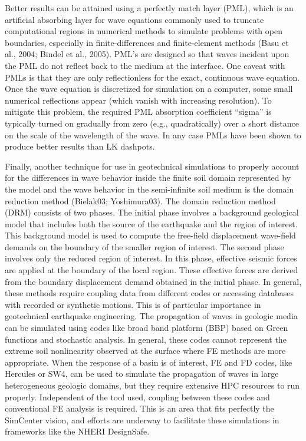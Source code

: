 Better results can be attained using a perfectly match layer (PML), which is an artificial absorbing layer for wave equations commonly used to truncate computational regions in numerical methods to simulate problems with open boundaries, especially in finite-differences and finite-element methods (Basu et al., 2004; Bindel et al., 2005). PML’s are designed so that waves incident upon the PML do not reflect back to the medium at the interface. One caveat with PMLs is that they are only reflectionless for the exact, continuous wave equation. Once the wave equation is discretized for simulation on a computer, some small numerical reflections appear (which vanish with increasing resolution). To mitigate this problem, the required PML absorption coefficient “sigma” is typically turned on gradually from zero (e.g., quadratically) over a short distance on the scale of the wavelength of the wave. In any case PMLs have been shown to produce better results than LK dashpots.

Finally, another technique for use in geotechnical simulations to properly account for the diﬀerences in wave behavior inside the ﬁnite soil domain represented by the model and the wave behavior in the semi-inﬁnite soil medium is the domain reduction method (Bielak03; Yoshimura03). The domain reduction method (DRM) consists of two phases. The initial phase involves a background geological model that includes both the source of the earthquake and the region of interest. This background model is used to compute the free-ﬁeld displacement wave-ﬁeld demands on the boundary of the smaller region of interest. The second phase involves only the reduced region of interest. In this phase, eﬀective seismic forces are applied at the boundary of the local region. These eﬀective forces are derived from the boundary displacement demand obtained in the initial phase. In general, these methods require coupling data from different codes or accessing databases with recorded or synthetic motions. This is of particular importance in geotechnical earthquake engineering. The propagation of waves in geologic media can be simulated using codes like broad band platform (BBP) based on Green functions and stochastic analysis. In general, these codes cannot represent the extreme soil nonlinearity observed at the surface where FE methods are more appropriate. When the response of a basin is of interest, FE and FD codes, like Hercules or SW4, can be used to simulate the propagation of waves in large heterogeneous geologic domains, but they require extensive HPC resources to run properly. Independent of the tool used, coupling between these codes and conventional FE analysis is required. This is an area that fits perfectly the SimCenter vision, and efforts are underway to facilitate these simulations in frameworks like the NHERI DesignSafe.

